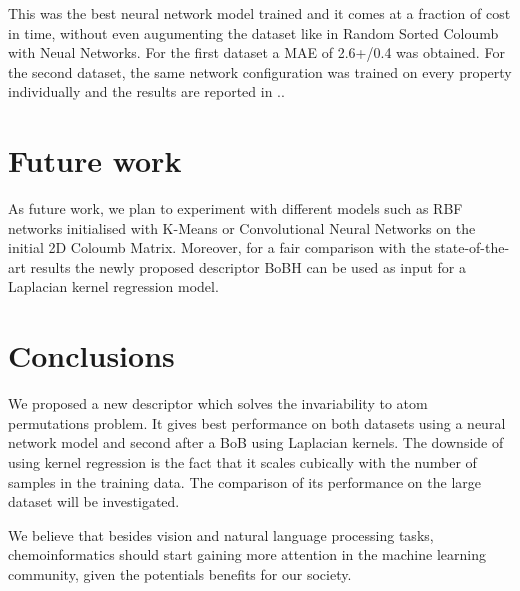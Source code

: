 \documentclass{article}
\begin{document}
This was the best neural network model trained and it comes at a fraction of cost in time, without even augumenting the dataset like in Random Sorted Coloumb with Neual Networks.
	For the first dataset a MAE of 2.6+/0.4 was obtained.
	For the second dataset, the same network configuration was trained on every property individually and the results are reported in ..

\section{Future work}
As future work, we plan to experiment with different models such as RBF networks initialised with K-Means or Convolutional Neural Networks on the initial 2D Coloumb Matrix. Moreover, for a fair comparison with the state-of-the-art results the newly proposed descriptor BoBH can be used as input for a Laplacian kernel regression model.

\section{Conclusions}
We proposed a new descriptor which solves the invariability to atom permutations problem. It gives best performance on both datasets using a neural network model and second after a BoB using Laplacian kernels. The downside of using kernel regression is the fact that it scales cubically with the number of samples in the training data. 
The comparison of its performance on the large dataset will be investigated.

We believe that besides vision and natural language processing tasks, chemoinformatics  should start gaining more attention  in the machine learning community, given the potentials benefits for our society.





\end{document}
